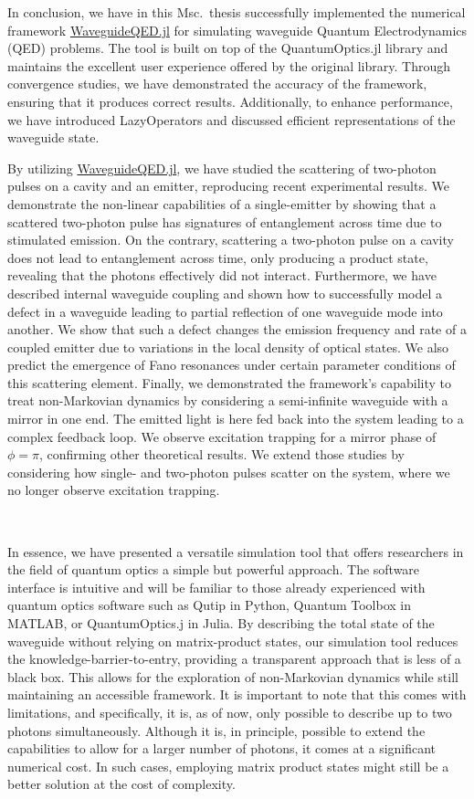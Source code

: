 In conclusion, we have in this Msc.~thesis successfully implemented the numerical framework \href{https://github.com/qojulia/WaveguideQED.jl}{WaveguideQED.jl} for simulating waveguide Quantum Electrodynamics (QED) problems. The tool is built on top of the QuantumOptics.jl library and maintains the excellent user experience offered by the original library. Through convergence studies, we have demonstrated the accuracy of the framework, ensuring that it produces correct results. Additionally, to enhance performance, we have introduced LazyOperators and discussed efficient representations of the waveguide state. 

By utilizing \href{https://github.com/qojulia/WaveguideQED.jl}{WaveguideQED.jl}, we have studied the scattering of two-photon pulses on a cavity and an emitter, reproducing recent experimental results. We demonstrate the non-linear capabilities of a single-emitter by showing that a scattered two-photon pulse has signatures of entanglement across time due to stimulated emission. On the contrary, scattering a two-photon pulse on a cavity does not lead to entanglement across time, only producing a product state, revealing that the photons effectively did not interact. Furthermore, we have described internal waveguide coupling and shown how to successfully model a defect in a waveguide leading to partial reflection of one waveguide mode into another. We show that such a defect changes the emission frequency and rate of a coupled emitter due to variations in the local density of optical states. We also predict the emergence of Fano resonances under certain parameter conditions of this scattering element. Finally, we demonstrated the framework's capability to treat non-Markovian dynamics by considering a semi-infinite waveguide with a mirror in one end. The emitted light is here fed back into the system leading to a complex feedback loop. We observe excitation trapping for a mirror phase of $\phi = \pi$, confirming other theoretical results. We extend those studies by considering how single- and two-photon pulses scatter on the system, where we no longer observe excitation trapping.

\

In essence, we have presented a versatile simulation tool that offers researchers in the field of quantum optics a simple but powerful approach. The software interface is intuitive and will be familiar to those already experienced with quantum optics software such as Qutip in Python, Quantum Toolbox in MATLAB, or QuantumOptics.j in Julia. By describing the total state of the waveguide without relying on matrix-product states, our simulation tool reduces the knowledge-barrier-to-entry, providing a transparent approach that is less of a black box. This allows for the exploration of non-Markovian dynamics while still maintaining an accessible framework. It is important to note that this comes with limitations, and specifically, it is, as of now, only possible to describe up to two photons simultaneously. Although it is, in principle, possible to extend the capabilities to allow for a larger number of photons, it comes at a significant numerical cost. In such cases, employing matrix product states might still be a better solution at the cost of complexity. 

